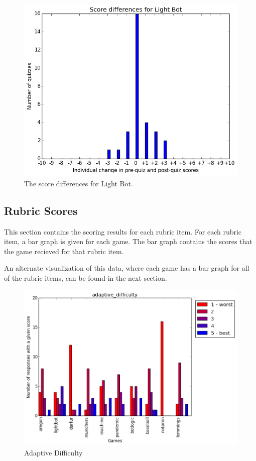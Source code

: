 			\begin{figure}[h] 
			\centering 
			\includegraphics[width=\textwidth]{lightbot_results.png} 
			\caption{The score differences for Light Bot.}
			\end{figure}







\cleardoublepage

		\subsection{Rubric Scores}
			This section contains the scoring results for each rubric item. For each rubric item, a bar graph is given for each game. The bar graph contains the scores that the game recieved for that rubric item.

			An alternate visualization of this data, where each game has a bar graph for all of the rubric items, can be found in the next section.

			\begin{figure}[h] 
			\centering 
			\includegraphics[width=\textwidth]{adaptive_difficulty_scores.png} 
			\caption{Adaptive Difficulty}
			\end{figure}

